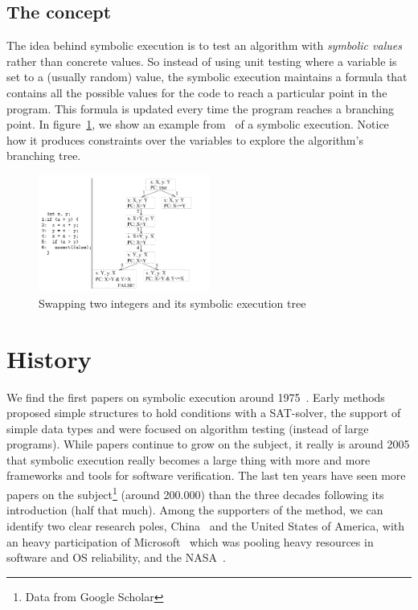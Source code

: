 \documentclass[11pt]{article}
\begin{document}
    \subsection{The concept}
      The idea behind symbolic execution is to test an algorithm with \emph{symbolic values} rather than concrete values. So instead of using unit testing where a variable is set to a (usually random) value, the symbolic execution maintains a formula that contains all the possible values for the code to reach a particular point in the program. This formula is updated every time the program reaches a branching point. In figure~\ref{fig:symbolicsimple}, we show an example from~\cite{visserWillemCorina} of a symbolic execution. Notice how it produces constraints over the variables to explore the algorithm's branching tree.
      \begin{figure}
        \includegraphics[width=0.5\textwidth]{symbolicsimple}
        \caption{Swapping two integers and its symbolic execution tree}
        \label{fig:symbolicsimple}
      \end{figure}

  \section{History}
    We find the first papers on symbolic execution around 1975~\cite{newapproach}. Early methods proposed simple structures to hold conditions with a SAT-solver, the support of simple data types and were focused on algorithm testing (instead of large programs). While papers continue to grow on the subject, it really is around 2005 that symbolic execution really becomes a large thing with more and more frameworks and tools for software verification. The last ten years have seen more papers on the subject\footnote{Data from Google Scholar} (around 200.000) than the three decades following its introduction (half that much). Among the supporters of the method, we can identify two clear research poles, China~\cite{Hardware, memorytablemodel, CHEN2018118} and the United States of America, with an heavy participation of Microsoft~\cite{bouncer-securing-software-by-blocking-bad-input} which was pooling heavy resources in software and OS reliability, and the NASA~\cite{neurosymbolicexecution, DirectedIncrementalSymExe, visserWillemCorina}.
\end{document}
